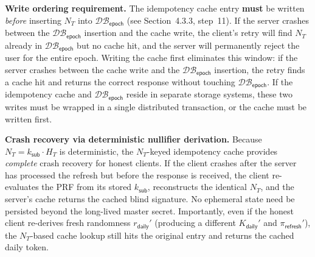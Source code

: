 \documentclass[11pt]{article}
\theoremstyle{definitionstyle}
\theoremstyle{plain}
\newcommand{\DB}{\mathcal{DB}}
\begin{document}
\textbf{Write ordering requirement.}
The idempotency cache entry \textbf{must} be written \emph{before} inserting $N_T$ into $\DB_{\mathsf{epoch}}$ (see Section~4.3.3, step~11). If the server crashes between the $\DB_{\mathsf{epoch}}$ insertion and the cache write, the client's retry will find $N_T$ already in $\DB_{\mathsf{epoch}}$ but no cache hit, and the server will permanently reject the user for the entire epoch. Writing the cache first eliminates this window: if the server crashes between the cache write and the $\DB_{\mathsf{epoch}}$ insertion, the retry finds a cache hit and returns the correct response without touching $\DB_{\mathsf{epoch}}$. If the idempotency cache and $\DB_{\mathsf{epoch}}$ reside in separate storage systems, these two writes must be wrapped in a single distributed transaction, or the cache must be written first.

\textbf{Crash recovery via deterministic nullifier derivation.}
Because $N_T = k_{\mathsf{sub}} \cdot H_T$ is deterministic, the $N_T$-keyed idempotency cache provides \emph{complete} crash recovery for honest clients.  If the client crashes after the server has processed the refresh but before the response is received, the client re-evaluates the PRF from its stored $k_{\mathsf{sub}}$, reconstructs the identical $N_T$, and the server's cache returns the cached blind signature.  No ephemeral state need be persisted beyond the long-lived master secret.  Importantly, even if the honest client re-derives fresh randomness $r_{\mathsf{daily}}'$ (producing a different $K_{\mathsf{daily}}'$ and $\pi_{\mathsf{refresh}}'$), the $N_T$-based cache lookup still hits the original entry and returns the cached daily token.
\end{document}
